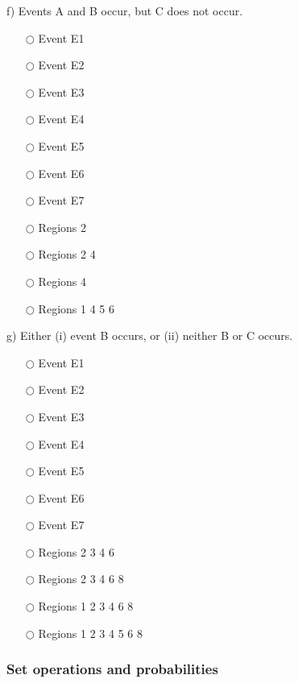 \documentclass[pdftex, brazil, 12pt, twoside]{article}
\begin{document}
\begin{exercise}
  f) Events A and B occur, but C does not occur.
  \begin{itemize}[noitemsep]
  \item[$\bigcirc$] Event E1
  \item[$\bigcirc$] Event E2
  \item[$\bigcirc$] Event E3
  \item[$\bigcirc$] Event E4
  \item[$\bigcirc$] Event E5
  \item[$\bigcirc$] Event E6
  \item[$\bigcirc$] Event E7
  \end{itemize}

  \begin{itemize}[noitemsep]
  \item[$\bigcirc$] Regions 2
  \item[$\bigcirc$] Regions 2 4
  \item[$\bigcirc$] Regions 4
  \item[$\bigcirc$] Regions 1 4 5 6
  \end{itemize}

  g) Either (i) event B occurs, or (ii) neither B or C occurs.
  \begin{itemize}[noitemsep]
  \item[$\bigcirc$] Event E1
  \item[$\bigcirc$] Event E2
  \item[$\bigcirc$] Event E3
  \item[$\bigcirc$] Event E4
  \item[$\bigcirc$] Event E5
  \item[$\bigcirc$] Event E6
  \item[$\bigcirc$] Event E7
  \end{itemize}

  \begin{itemize}[noitemsep]
  \item[$\bigcirc$] Regions 2 3 4 6
  \item[$\bigcirc$] Regions 2 3 4 6 8
  \item[$\bigcirc$] Regions 1 2 3 4 6 8
  \item[$\bigcirc$] Regions 1 2 3 4 5 6 8
  \end{itemize}
\end{exercise}

\subsubsection{Set operations and probabilities}
\label{un1-ps1-set-operations}
\end{document}
